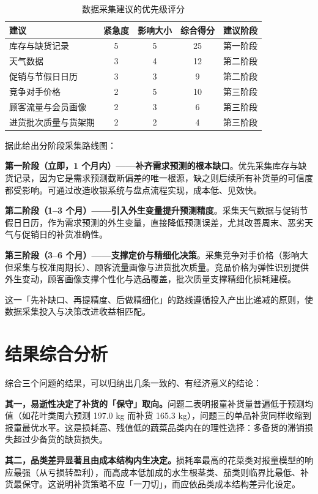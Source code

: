 \documentclass[12pt]{ctexart}
\begin{document}
\begin{table}[htbp]
\centering
\caption{数据采集建议的优先级评分}
\label{tab:priority}
\begin{tabular}{lcccc}
\toprule
建议 & 紧急度 & 影响大小 & 综合得分 & 建议阶段 \\
\midrule
库存与缺货记录 & 5 & 5 & 25 & 第一阶段 \\
天气数据 & 3 & 4 & 12 & 第二阶段 \\
促销与节假日日历 & 3 & 3 & 9 & 第二阶段 \\
竞争对手价格 & 2 & 5 & 10 & 第三阶段 \\
顾客流量与会员画像 & 2 & 3 & 6 & 第三阶段 \\
进货批次质量与货架期 & 2 & 2 & 4 & 第三阶段 \\
\bottomrule
\end{tabular}
\end{table}

据此给出分阶段采集路线图：

\textbf{第一阶段（立即，1 个月内）——补齐需求预测的根本缺口}。优先采集库存与缺货记录，因为它是需求预测截断偏差的唯一根源，缺之则后续所有补货量的可信度都受影响。可通过改造收银系统与盘点流程实现，成本低、见效快。

\textbf{第二阶段（1--3 个月）——引入外生变量提升预测精度}。采集天气数据与促销节假日日历，作为需求预测的外生变量，直接降低预测误差，尤其改善周末、恶劣天气与促销日的补货准确性。

\textbf{第三阶段（3--6 个月）——支撑定价与精细化决策}。采集竞争对手价格（影响大但采集与校准周期长）、顾客流量画像与进货批次质量。竞品价格为弹性识别提供外生变动，顾客画像支撑个性化与选品覆盖，批次质量支撑精细化损耗建模。

这一「先补缺口、再提精度、后做精细化」的路线遵循投入产出比递减的原则，使数据采集投入与决策改进收益相匹配。

\section{结果综合分析}

综合三个问题的结果，可以归纳出几条一致的、有经济意义的结论：

\textbf{其一，易逝性决定了补货的「保守」取向。}问题二表明报童补货量普遍低于预测均值（如花叶类周六预测 197.0 kg 而补货 165.3 kg），问题三的单品补货同样收缩到报童最优水平。这是损耗高、残值低的蔬菜品类内在的理性选择：多备货的滞销损失超过少备货的缺货损失。

\textbf{其二，品类差异显著且由成本结构内生决定。}损耗率最高的花菜类对报童模型的响应最强（从亏损转盈利），而高成本低加成的水生根茎类、茄类则临界比最低、补货最保守。这说明补货策略不应「一刀切」，而应依品类成本结构差异化设定。
\end{document}

